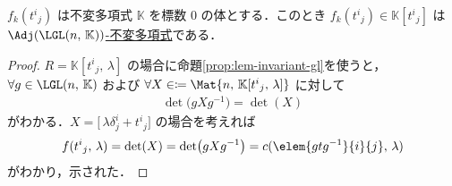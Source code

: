 \documentclass[TQFT_main]{subfiles}
\begin{document}
\begin{myprop}[label=prop:det-coeff-invariant]{$f_k(t^i{}_j)$ は不変多項式}
    $\mathbb{K}$ を標数 $0$ の体とする．このとき $f_k (t^i{}_j) \in \mathbb{K}[t^i{}_j]$ は\hyperref[label]{$\Adj(\LGL(n,\, \mathbb{K}))$-不変多項式}である．
\end{myprop}

\begin{proof}
    $R = \mathbb{K}[t^i{}_j,\, \lambda]$ の場合に命題\ref{prop:lem-invariant-gl}を使うと，$\forall g \in \LGL(n,\, \mathbb{K})$ および $\forall X \in  \coloneqq \Mat{n,\, \mathbb{K}[t^i{}_j,\, \lambda]}$ に対して
    \begin{align}
        \det \bigl( g X g^{-1}\bigr) = \det(X)
    \end{align}
    がわかる．$X = \bigl[ \, \lambda \delta^i_j + t^i{}_j \bigr]$ の場合を考えれば
    \begin{align}
        f(t^i{}_j,\, \lambda) = \det(X) = \det(gXg^{-1}) = c(\elem{gtg^{-1}}{i}{j},\, \lambda)
    \end{align}
    がわかり，示された．
\end{proof}
\end{document}
